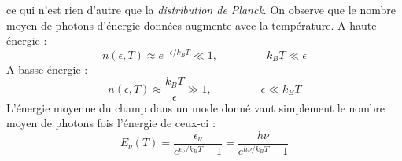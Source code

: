 \documentclass	[11pt, a4paper, openany]{book}
\begin{document}
ce qui n'est rien d'autre que la \textit{distribution de Planck}. On observe que le nombre moyen de 
photons d'énergie données augmente avec la température. A  haute énergie :
\begin{equation}
n(\epsilon,T) \approx e^{-\epsilon/k_BT} \ll 1,\ \ \ \ \ \ \ \ \ \ \ \ \ \ \ \ \ \ \ \  k_BT\ll\epsilon
\end{equation}
A basse énergie :
\begin{equation}
n(\epsilon,T) \approx \frac{k_BT}{\epsilon} \gg 1,\ \ \ \ \ \ \ \ \ \ \ \ \ \ \ \ \ \ \ \ \epsilon\ll k_BT
\end{equation}
L'énergie moyenne du champ dans un mode donné vaut simplement le nombre moyen de photons fois l'énergie 
de ceux-ci :
\begin{equation}
\overline{E}_\nu(T) = \dfrac{\epsilon_\nu}{e^{\epsilon_\nu/k_BT}-1} = \dfrac{h\nu}{e^{h\nu/k_BT}-1}
\label{eq:ResQuant}
\end{equation}
\end{document}
